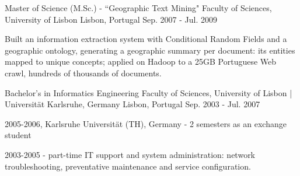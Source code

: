 \begin{cventries}
  \cventry
    {Master of Science (M.Sc.) - ``Geographic Text Mining"} %
	{Faculty of Sciences, University of Lisbon} %
    {Lisbon, Portugal} %
    {Sep. 2007 - Jul. 2009} %
    {
      \begin{cvitems} %
        \item {Built an information extraction system with Conditional Random Fields and a geographic ontology, generating a geographic summary per document: its entities mapped to unique concepts; applied on Hadoop to a 25GB Portuguese Web crawl, hundreds of thousands of documents.}
      \end{cvitems}
    }


  \cventry
    {Bachelor's in Informatics Engineering} %
	{Faculty of Sciences, University of Lisbon | Universität Karlsruhe, Germany} %
    {Lisbon, Portugal} %
    {Sep. 2003 - Jul. 2007} %
    {
      \begin{cvitems} %
        \item {2005-2006, Karlsruhe Universität (TH), Germany - 2 semesters as an exchange student}
		\item {2003-2005 - part-time IT support and system administration: network troubleshooting, preventative maintenance and service configuration.}
      \end{cvitems}
    }

	
	

\end{cventries}
